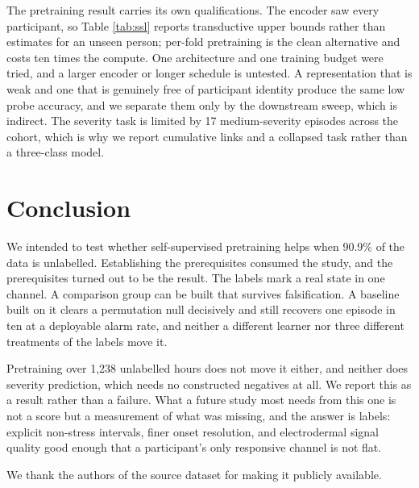\documentclass{article}
\begin{document}
The pretraining result carries its own qualifications. The encoder saw every
participant, so Table \ref{tab:ssl} reports transductive upper bounds rather
than estimates for an unseen person; per-fold pretraining is the clean
alternative and costs ten times the compute. One architecture and one training
budget were tried, and a larger encoder or longer schedule is untested. A
representation that is weak and one that is genuinely free of participant
identity produce the same low probe accuracy, and we separate them only by the
downstream sweep, which is indirect. The severity task is limited by 17
medium-severity episodes across the cohort, which is why we report cumulative
links and a collapsed task rather than a three-class model.

\section{Conclusion}

We intended to test whether self-supervised pretraining helps when
90.9\% of the data is unlabelled. Establishing the prerequisites
consumed the study, and the prerequisites turned out to be the result. The
labels mark a real state in one channel. A comparison group can be built that
survives falsification. A baseline built on it clears a permutation null
decisively and still recovers one episode in ten at a deployable alarm rate,
and neither a different learner nor three different treatments of the labels
move it.

Pretraining over 1,238 unlabelled hours does not move it either, and neither
does severity prediction, which needs no constructed negatives at all. We
report this as a result rather than a failure. What a future study most needs
from this one is not a score but a measurement of what was missing, and the
answer is labels: explicit non-stress intervals, finer onset resolution, and
electrodermal signal quality good enough that a participant's only responsive
channel is not flat.

\begin{ack}
We thank the authors of the source dataset for making it publicly available.
\end{ack}
\end{document}
